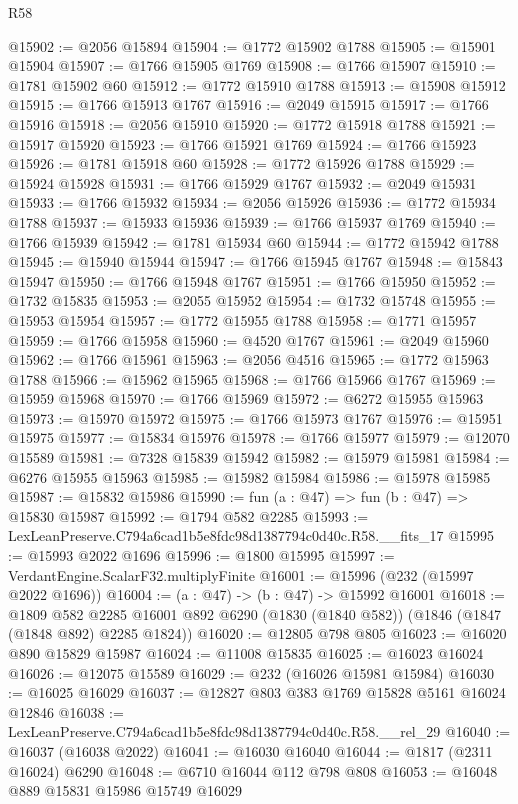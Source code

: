 \begin{lexlean}{R58}
\begin{coremodule}
@15902 := @2056 @15894
@15904 := @1772 @15902 @1788
@15905 := @15901 @15904
@15907 := @1766 @15905 @1769
@15908 := @1766 @15907
@15910 := @1781 @15902 @60
@15912 := @1772 @15910 @1788
@15913 := @15908 @15912
@15915 := @1766 @15913 @1767
@15916 := @2049 @15915
@15917 := @1766 @15916
@15918 := @2056 @15910
@15920 := @1772 @15918 @1788
@15921 := @15917 @15920
@15923 := @1766 @15921 @1769
@15924 := @1766 @15923
@15926 := @1781 @15918 @60
@15928 := @1772 @15926 @1788
@15929 := @15924 @15928
@15931 := @1766 @15929 @1767
@15932 := @2049 @15931
@15933 := @1766 @15932
@15934 := @2056 @15926
@15936 := @1772 @15934 @1788
@15937 := @15933 @15936
@15939 := @1766 @15937 @1769
@15940 := @1766 @15939
@15942 := @1781 @15934 @60
@15944 := @1772 @15942 @1788
@15945 := @15940 @15944
@15947 := @1766 @15945 @1767
@15948 := @15843 @15947
@15950 := @1766 @15948 @1767
@15951 := @1766 @15950
@15952 := @1732 @15835
@15953 := @2055 @15952
@15954 := @1732 @15748
@15955 := @15953 @15954
@15957 := @1772 @15955 @1788
@15958 := @1771 @15957
@15959 := @1766 @15958
@15960 := @4520 @1767
@15961 := @2049 @15960
@15962 := @1766 @15961
@15963 := @2056 @4516
@15965 := @1772 @15963 @1788
@15966 := @15962 @15965
@15968 := @1766 @15966 @1767
@15969 := @15959 @15968
@15970 := @1766 @15969
@15972 := @6272 @15955 @15963
@15973 := @15970 @15972
@15975 := @1766 @15973 @1767
@15976 := @15951 @15975
@15977 := @15834 @15976
@15978 := @1766 @15977
@15979 := @12070 @15589
@15981 := @7328 @15839 @15942
@15982 := @15979 @15981
@15984 := @6276 @15955 @15963
@15985 := @15982 @15984
@15986 := @15978 @15985
@15987 := @15832 @15986
@15990 := fun (a : @47) => fun (b : @47) => @15830 @15987
@15992 := @1794 @582 @2285
@15993 := LexLeanPreserve.C794a6cad1b5e8fdc98d1387794c0d40c.R58.__fits_17
@15995 := @15993 @2022 @1696
@15996 := @1800 @15995
@15997 := VerdantEngine.ScalarF32.multiplyFinite
@16001 := @15996 (@232 (@15997 @2022 @1696))
@16004 := (a : @47) -> (b : @47) -> @15992 @16001
@16018 := @1809
    @582
    @2285
    @16001
    @892
    @6290
    (@1830 (@1840 @582))
    (@1846 (@1847 (@1848 @892) @2285 @1824))
@16020 := @12805 @798 @805
@16023 := @16020 @890 @15829 @15987
@16024 := @11008 @15835
@16025 := @16023 @16024
@16026 := @12075 @15589
@16029 := @232 (@16026 @15981 @15984)
@16030 := @16025 @16029
@16037 := @12827 @803 @383 @1769 @15828 @5161 @16024 @12846
@16038 := LexLeanPreserve.C794a6cad1b5e8fdc98d1387794c0d40c.R58.__rel_29
@16040 := @16037 (@16038 @2022)
@16041 := @16030 @16040
@16044 := @1817 (@2311 @16024) @6290
@16048 := @6710 @16044 @112 @798 @808
@16053 := @16048 @889 @15831 @15986 @15749 @16029

\end{coremodule}
\end{lexlean}
